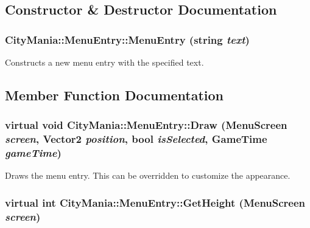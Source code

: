 \subsection{Constructor \& Destructor Documentation}
\hypertarget{classCityMania_1_1MenuEntry_a2767be7f86275b7d0063d938897bdc55}{
\subsubsection[{MenuEntry}]{\setlength{\rightskip}{0pt plus 5cm}CityMania::MenuEntry::MenuEntry (string {\em text})}}
\label{classCityMania_1_1MenuEntry_a2767be7f86275b7d0063d938897bdc55}


Constructs a new menu entry with the specified text. 

\subsection{Member Function Documentation}
\hypertarget{classCityMania_1_1MenuEntry_a967b77f88de3650229d320712349d3b0}{
\subsubsection[{Draw}]{\setlength{\rightskip}{0pt plus 5cm}virtual void CityMania::MenuEntry::Draw ({\bf MenuScreen} {\em screen}, \/  Vector2 {\em position}, \/  bool {\em isSelected}, \/  GameTime {\em gameTime})}}
\label{classCityMania_1_1MenuEntry_a967b77f88de3650229d320712349d3b0}


Draws the menu entry. This can be overridden to customize the appearance. \hypertarget{classCityMania_1_1MenuEntry_ac547564728d74c6e59747e57831a0d07}{
\subsubsection[{GetHeight}]{\setlength{\rightskip}{0pt plus 5cm}virtual int CityMania::MenuEntry::GetHeight ({\bf MenuScreen} {\em screen})}}
\label{classCityMania_1_1MenuEntry_ac547564728d74c6e59747e57831a0d07}


